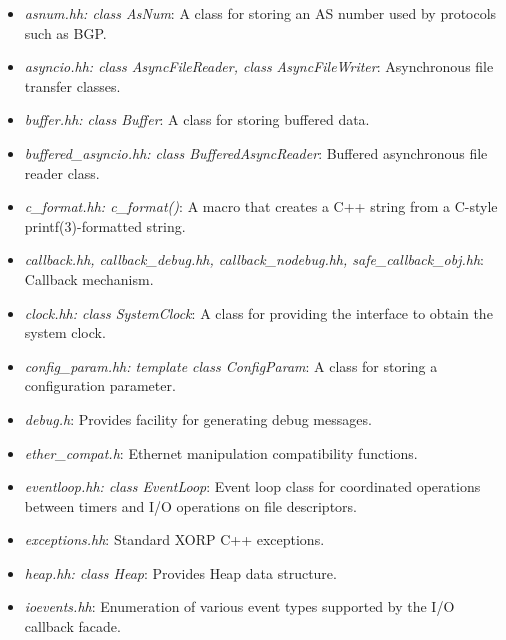 \documentclass[11pt]{article}
\begin{document}
\begin{itemize}

  \item \emph{asnum.hh: class AsNum}: A class for storing an AS number
  used by protocols such as BGP.

  \item \emph{asyncio.hh: class AsyncFileReader, class AsyncFileWriter}:
  Asynchronous file transfer classes.

  \item \emph{buffer.hh: class Buffer}:  A class for storing buffered
  data.

  \item \emph{buffered\_asyncio.hh: class BufferedAsyncReader}:
  Buffered asynchronous file reader class.

  \item \emph{c\_format.hh: c\_format()}: A macro that creates a C++
  string from a C-style printf(3)-formatted string.

  \item \emph{callback.hh, callback\_debug.hh, callback\_nodebug.hh,
  safe\_callback\_obj.hh}:
  Callback mechanism.

  \item \emph{clock.hh: class SystemClock}: A class for providing the
  interface to obtain the system clock.

  \item \emph{config\_param.hh: template class ConfigParam}: A class for
  storing a configuration parameter.

  \item \emph{debug.h}: Provides facility for generating debug messages.

  \item \emph{ether\_compat.h}: Ethernet manipulation compatibility
  functions.

  \item \emph{eventloop.hh: class EventLoop}: Event loop class for
  coordinated operations between timers and I/O operations on file
  descriptors.

  \item \emph{exceptions.hh}: Standard XORP C++ exceptions.

  \item \emph{heap.hh: class Heap}: Provides Heap data structure.

  \item \emph{ioevents.hh}: Enumeration of various event types supported
  by the I/O callback facade.


\end{itemize}
\end{document}
